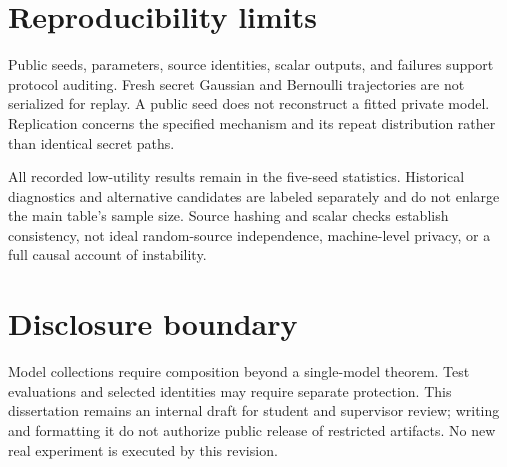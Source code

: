 \section{Reproducibility limits}
Public seeds, parameters, source identities, scalar outputs, and failures support protocol auditing. Fresh secret Gaussian and Bernoulli trajectories are not serialized for replay. A public seed does not reconstruct a fitted private model. Replication concerns the specified mechanism and its repeat distribution rather than identical secret paths.

All recorded low-utility results remain in the five-seed statistics. Historical diagnostics and alternative candidates are labeled separately and do not enlarge the main table's sample size. Source hashing and scalar checks establish consistency, not ideal random-source independence, machine-level privacy, or a full causal account of instability.

\section{Disclosure boundary}
Model collections require composition beyond a single-model theorem. Test evaluations and selected identities may require separate protection. This dissertation remains an internal draft for student and supervisor review; writing and formatting it do not authorize public release of restricted artifacts. No new real experiment is executed by this revision.

